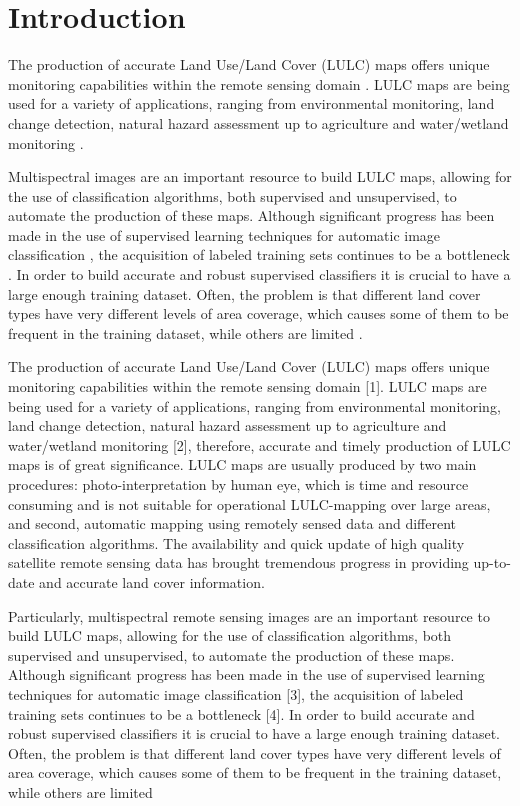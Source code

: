 \documentclass[remotesensing,article,submit,moreauthors,pdftex]{Definitions/mdpi}
\begin{document}
\section{Introduction}
The production of accurate Land Use/Land Cover (LULC) maps offers unique
monitoring capabilities within the remote sensing domain \cite{Mellor2015}. LULC
maps are being used for a variety of applications, ranging from environmental
monitoring, land change detection, natural hazard assessment up to agriculture
and water/wetland monitoring \cite{Khatami2016}.

Multispectral images are an important resource to build LULC maps, allowing for
the use of classification algorithms, both supervised and unsupervised, to
automate the production of these maps. Although significant progress has been
made in the use of supervised learning techniques for automatic image
classification \cite{Tewkesbury2015}, the acquisition of labeled training sets
continues to be a bottleneck \cite{Rajan2008}. In order to build accurate and
robust supervised classifiers it is crucial to have a large enough training
dataset. Often, the problem is that different land cover types have very
different levels of area coverage, which causes some of them to be frequent in
the training dataset, while others are limited \cite{Feng2019}.

The production of accurate Land Use/Land Cover (LULC) maps offers unique 
monitoring
capabilities within the remote sensing domain [1]. LULC maps are being used for 
a variety of applications, ranging from environmental monitoring, land change 
detection, natural hazard assessment up to agriculture and water/wetland 
monitoring [2], therefore, accurate and timely production of LULC maps is of 
great significance. LULC maps are usually produced by two main procedures: 
photo-interpretation by human eye, which is time and resource consuming and is 
not suitable for operational LULC-mapping over large areas, and second, 
automatic mapping using remotely sensed data and different classification 
algorithms. 
The availability and quick update of high quality satellite remote sensing data 
has brought tremendous progress in providing up-to-date and accurate land cover 
information.

Particularly, multispectral remote sensing images are an important resource to 
build LULC maps, allowing for the use of classification algorithms, both 
supervised and unsupervised, to automate the production of these maps. Although 
significant progress has been made in the use of supervised learning techniques 
for automatic image classification [3], the acquisition of labeled training 
sets continues to be a bottleneck [4]. In order to build accurate and robust 
supervised classifiers it is crucial to have a large enough training dataset. 
Often, the problem is that different land cover types have very different 
levels of area coverage, which causes some of them to be frequent in the 
training dataset, while others are limited
\end{document}
